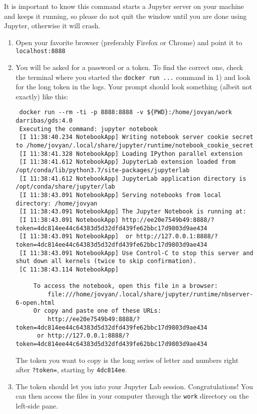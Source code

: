 \documentclass[
]{book}
\begin{document}
It is important to know this command starts a Jupyter server on your machine and keeps it running, so please do not quit the window until you are
done using Jupyter, otherwise it will crash.

\begin{enumerate}
\def\labelenumi{\arabic{enumi}.}
\setcounter{enumi}{1}
\item
  Open your favorite browser (preferably Firefox or Chrome) and point it to
  \texttt{localhost:8888}
\item
  You will be asked for a password or a token. To find the correct one, check
  the terminal where you started the \texttt{docker\ run\ ...} command in 1) and look
  for the long token in the logs. Your prompt should look something (albeit
  not exactly) like this:

\begin{verbatim}
 docker run --rm -ti -p 8888:8888 -v ${PWD}:/home/jovyan/work darribas/gds:4.0
 Executing the command: jupyter notebook
 [I 11:38:40.234 NotebookApp] Writing notebook server cookie secret to /home/jovyan/.local/share/jupyter/runtime/notebook_cookie_secret
 [I 11:38:41.328 NotebookApp] Loading IPython parallel extension
 [I 11:38:41.612 NotebookApp] JupyterLab extension loaded from /opt/conda/lib/python3.7/site-packages/jupyterlab
 [I 11:38:41.612 NotebookApp] JupyterLab application directory is /opt/conda/share/jupyter/lab
 [I 11:38:43.091 NotebookApp] Serving notebooks from local directory: /home/jovyan
 [I 11:38:43.091 NotebookApp] The Jupyter Notebook is running at:
 [I 11:38:43.091 NotebookApp] http://ee20e7549b49:8888/?token=4dc814ee44c64383d5d32dfd439fe62bbc17d9803d9ae434
 [I 11:38:43.091 NotebookApp]  or http://127.0.0.1:8888/?token=4dc814ee44c64383d5d32dfd439fe62bbc17d9803d9ae434
 [I 11:38:43.091 NotebookApp] Use Control-C to stop this server and shut down all kernels (twice to skip confirmation).
 [C 11:38:43.114 NotebookApp]

     To access the notebook, open this file in a browser:
         file:///home/jovyan/.local/share/jupyter/runtime/nbserver-6-open.html
     Or copy and paste one of these URLs:
         http://ee20e7549b49:8888/?token=4dc814ee44c64383d5d32dfd439fe62bbc17d9803d9ae434
      or http://127.0.0.1:8888/?token=4dc814ee44c64383d5d32dfd439fe62bbc17d9803d9ae434
\end{verbatim}

  The token you want to copy is the long series of letter and numbers right
  after \texttt{?token=}, starting by \texttt{4dc814ee}.
\item
  The token should let you into your Jupyter Lab session. Congratulations!
  You can then access the files in your computer through the \texttt{work} directory
  on the left-side pane.
\end{enumerate}
\end{document}
